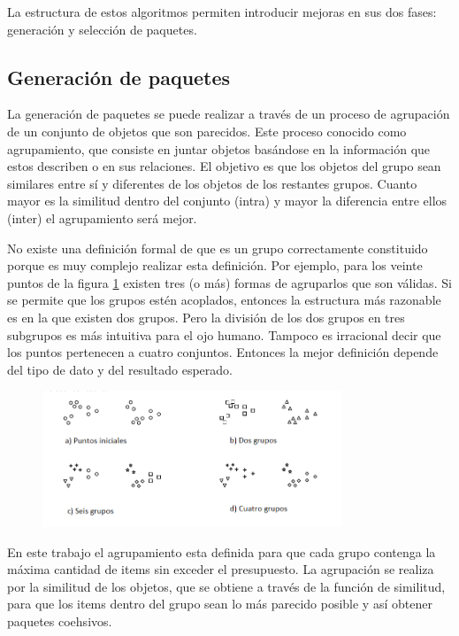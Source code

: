 La estructura de estos algoritmos permiten introducir mejoras en sus dos fases: generación y selección de paquetes.
\subsection{Generación de paquetes}
La generación de paquetes se puede realizar a través de un proceso de agrupación de un conjunto de objetos que son parecidos. Este proceso conocido como agrupamiento, que consiste en juntar objetos basándose en la información que estos describen o en sus relaciones. El objetivo es que los objetos del grupo sean similares entre sí y diferentes de los objetos de los restantes grupos. Cuanto mayor es la similitud dentro del conjunto (intra) y mayor la diferencia entre ellos (inter) el agrupamiento será mejor.

No existe una definición formal de que es un grupo correctamente constituido porque es muy complejo realizar esta definición. Por ejemplo, para los veinte puntos de la figura \ref{res:img-howToCluster} existen tres (o más) formas de agruparlos que son válidas. Si se permite que los grupos estén acoplados, entonces la estructura más razonable es en la que existen dos grupos. Pero la división de los dos grupos en tres subgrupos es más intuitiva para el ojo humano. Tampoco es irracional decir que los puntos pertenecen a cuatro conjuntos. Entonces la mejor definición depende del tipo de dato y del resultado esperado.

\begin{figure}[H]
  \centering
   \includegraphics[width=0.8\textwidth]{img/howToCluster.png}
   \caption{}
   \label{res:img-howToCluster}
\end{figure}
En este trabajo el agrupamiento esta definida para que cada grupo contenga la máxima cantidad de items sin exceder el presupuesto. La agrupación se realiza por la similitud de los objetos, que se obtiene a través de la función de similitud, para que los items dentro del grupo sean lo más parecido posible y así obtener paquetes coehsivos.

